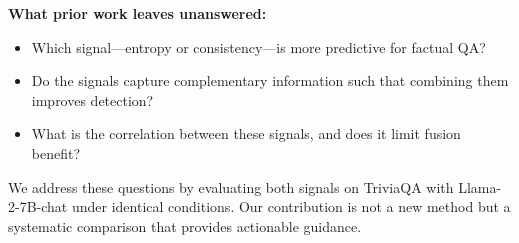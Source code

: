 \textbf{What prior work leaves unanswered:}
\begin{itemize}
    \item Which signal---entropy or consistency---is more predictive for factual QA?
    \item Do the signals capture complementary information such that combining them improves detection?
    \item What is the correlation between these signals, and does it limit fusion benefit?
\end{itemize}

We address these questions by evaluating both signals on TriviaQA with Llama-2-7B-chat under identical conditions. Our contribution is not a new method but a systematic comparison that provides actionable guidance.
